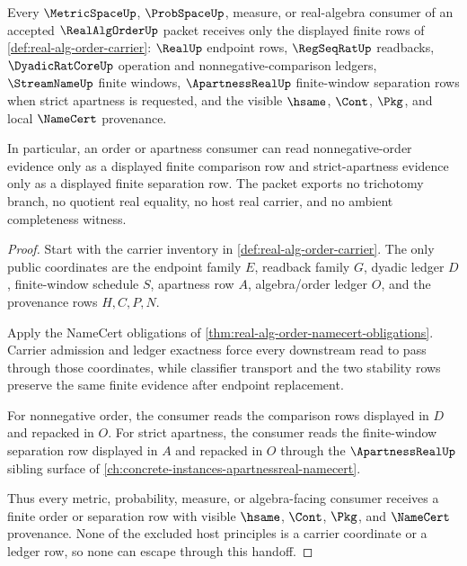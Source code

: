 \begin{theorem}
\label{thm:real-alg-order-apartness-nonescape}
Every $\MetricSpaceUp$, $\ProbSpaceUp$, measure, or real-algebra consumer of an accepted $\RealAlgOrderUp$ packet receives only the displayed finite rows of \autoref{def:real-alg-order-carrier}: $\RealUp$ endpoint rows, $\RegSeqRatUp$ readbacks, $\DyadicRatCoreUp$ operation and nonnegative-comparison ledgers, $\StreamNameUp$ finite windows, $\ApartnessRealUp$ finite-window separation rows when strict apartness is requested, and the visible $\hsame$, $\Cont$, $\Pkg$, and local $\NameCert$ provenance.

In particular, an order or apartness consumer can read nonnegative-order evidence only as a displayed finite comparison row and strict-apartness evidence only as a displayed finite separation row. The packet exports no trichotomy branch, no quotient real equality, no host real carrier, and no ambient completeness witness.
\end{theorem}
\begin{proof}
Start with the carrier inventory in \autoref{def:real-alg-order-carrier}. The only public coordinates are the endpoint family $E$, readback family $G$, dyadic ledger $D$, finite-window schedule $S$, apartness row $A$, algebra/order ledger $O$, and the provenance rows $H,C,P,N$.

Apply the NameCert obligations of \autoref{thm:real-alg-order-namecert-obligations}. Carrier admission and ledger exactness force every downstream read to pass through those coordinates, while classifier transport and the two stability rows preserve the same finite evidence after endpoint replacement.

For nonnegative order, the consumer reads the comparison rows displayed in $D$ and repacked in $O$. For strict apartness, the consumer reads the finite-window separation row displayed in $A$ and repacked in $O$ through the $\ApartnessRealUp$ sibling surface of \autoref{ch:concrete-instances-apartnessreal-namecert}.

Thus every metric, probability, measure, or algebra-facing consumer receives a finite order or separation row with visible $\hsame$, $\Cont$, $\Pkg$, and $\NameCert$ provenance. None of the excluded host principles is a carrier coordinate or a ledger row, so none can escape through this handoff.
\end{proof}

